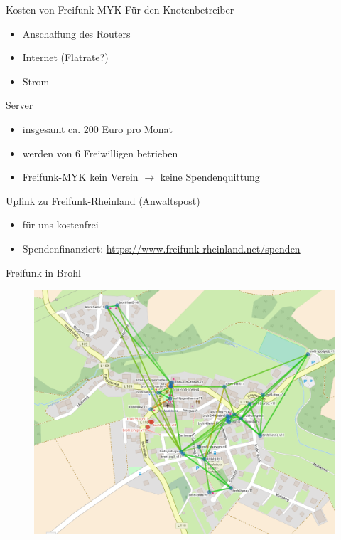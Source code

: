 \documentclass{beamer}
\begin{document}
\begin{frame}{Kosten von Freifunk-MYK}
Für den Knotenbetreiber
\begin{itemize}
\item Anschaffung des Routers
\item Internet (Flatrate?)
\item Strom
\end{itemize}
Server
\begin{itemize}
\item insgesamt ca. 200 Euro pro Monat
\item werden von 6 Freiwilligen betrieben
\item Freifunk-MYK kein Verein $\to$ keine Spendenquittung
\end{itemize}
Uplink zu Freifunk-Rheinland (Anwaltspost)
\begin{itemize}
\item für uns kostenfrei
\item Spendenfinanziert: \url{https://www.freifunk-rheinland.net/spenden}
\end{itemize}

\end{frame}

\begin{frame}{Freifunk in Brohl}
\begin{figure}
	\centering
\includegraphics[width=0.7\linewidth]{Bilder/Brohl}
\caption{}
\label{fig:brohl}
\end{figure}
\end{frame}
\end{document}
